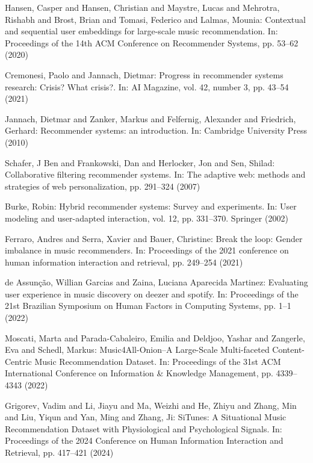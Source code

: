\documentclass[runningheads,a4paper]{llncs}
\begin{document}
\begin{thebibliography}{4}
 Hansen, Casper and Hansen, Christian and Maystre, Lucas and Mehrotra, Rishabh and Brost, Brian and Tomasi, Federico and Lalmas, Mounia:
Contextual and sequential user embeddings for large-scale music recommendation. In: 
Proceedings of the 14th ACM Conference on Recommender Systems, pp. 53--62 (2020)

 Cremonesi, Paolo and Jannach, Dietmar: Progress in recommender systems research: Crisis? What crisis?. In:
AI Magazine, vol. 42, number 3, pp. 43--54 (2021)

 Jannach, Dietmar and Zanker, Markus and Felfernig, Alexander and Friedrich, Gerhard: 
Recommender systems: an introduction. In: Cambridge University Press (2010)

 Schafer, J Ben and Frankowski, Dan and Herlocker, Jon and Sen, Shilad:
Collaborative filtering recommender systems. In: The adaptive web: methods and strategies of web personalization,
pp. 291--324 (2007)

 Burke, Robin: Hybrid recommender systems: Survey and experiments. In:
User modeling and user-adapted interaction, vol. 12, pp. 331--370. Springer (2002)

 Ferraro, Andres and Serra, Xavier and Bauer, Christine:
Break the loop: Gender imbalance in music recommenders. In:
Proceedings of the 2021 conference on human information interaction and retrieval,
pp. 249--254 (2021)

 de Assun{\c{c}}{\~a}o, Willian Garcias and Zaina, Luciana Aparecida Martinez:
Evaluating user experience in music discovery on deezer and spotify. In:
Proceedings of the 21st Brazilian Symposium on Human Factors in Computing Systems, pp. 1--1 (2022)

 Moscati, Marta and Parada-Cabaleiro, Emilia and Deldjoo, Yashar and Zangerle, Eva and Schedl, Markus:
Music4All-Onion--A Large-Scale Multi-faceted Content-Centric Music Recommendation Dataset. In:
Proceedings of the 31st ACM International Conference on Information \& Knowledge Management, pp. 4339--4343 (2022)

 Grigorev, Vadim and Li, Jiayu and Ma, Weizhi and He, Zhiyu and Zhang, Min and Liu, Yiqun and Yan, Ming and Zhang, Ji:
SiTunes: A Situational Music Recommendation Dataset with Physiological and Psychological Signals. In: Proceedings of the 2024 Conference on Human Information Interaction and Retrieval,
pp. 417--421 (2024)


\end{thebibliography}
\end{document}
